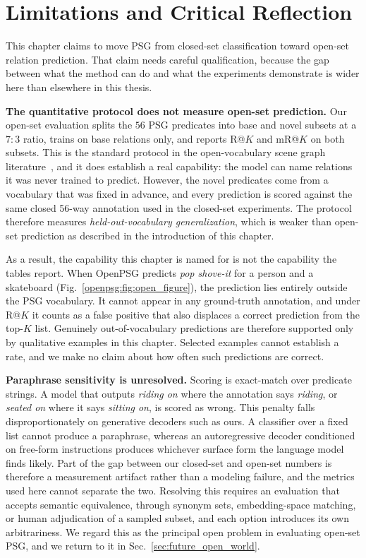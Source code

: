 \section{Limitations and Critical Reflection}
\label{openpsg:sec:limitations}
This chapter claims to move PSG from closed-set classification toward open-set relation prediction. That claim needs careful qualification, because the gap between what the method can do and what the experiments demonstrate is wider here than elsewhere in this thesis.

\noindent \textbf{The quantitative protocol does not measure open-set prediction.}
Our open-set evaluation splits the $56$ PSG predicates into base and novel subsets at a $7\!:\!3$ ratio, trains on base relations only, and reports R@$K$ and mR@$K$ on both subsets. This is the standard protocol in the open-vocabulary scene graph literature~\citep{yu2023visually, chen2023expanding}, and it does establish a real capability: the model can name relations it was never trained to predict. However, the novel predicates come from a vocabulary that was fixed in advance, and every prediction is scored against the same closed 56-way annotation used in the closed-set experiments. The protocol therefore measures \emph{held-out-vocabulary generalization}, which is weaker than open-set prediction as described in the introduction of this chapter.

As a result, the capability this chapter is named for is not the capability the tables report. When OpenPSG predicts \textit{pop shove-it} for a person and a skateboard (Fig.~\ref{openpsg:fig:open_figure}), the prediction lies entirely outside the PSG vocabulary. It cannot appear in any ground-truth annotation, and under R@$K$ it counts as a false positive that also displaces a correct prediction from the top-$K$ list. Genuinely out-of-vocabulary predictions are therefore supported only by qualitative examples in this chapter. Selected examples cannot establish a rate, and we make no claim about how often such predictions are correct.

\noindent \textbf{Paraphrase sensitivity is unresolved.}
Scoring is exact-match over predicate strings. A model that outputs \textit{riding on} where the annotation says \textit{riding}, or \textit{seated on} where it says \textit{sitting on}, is scored as wrong. This penalty falls disproportionately on generative decoders such as ours. A classifier over a fixed list cannot produce a paraphrase, whereas an autoregressive decoder conditioned on free-form instructions produces whichever surface form the language model finds likely. Part of the gap between our closed-set and open-set numbers is therefore a measurement artifact rather than a modeling failure, and the metrics used here cannot separate the two. Resolving this requires an evaluation that accepts semantic equivalence, through synonym sets, embedding-space matching, or human adjudication of a sampled subset, and each option introduces its own arbitrariness. We regard this as the principal open problem in evaluating open-set PSG, and we return to it in Sec.~\ref{sec:future_open_world}.

